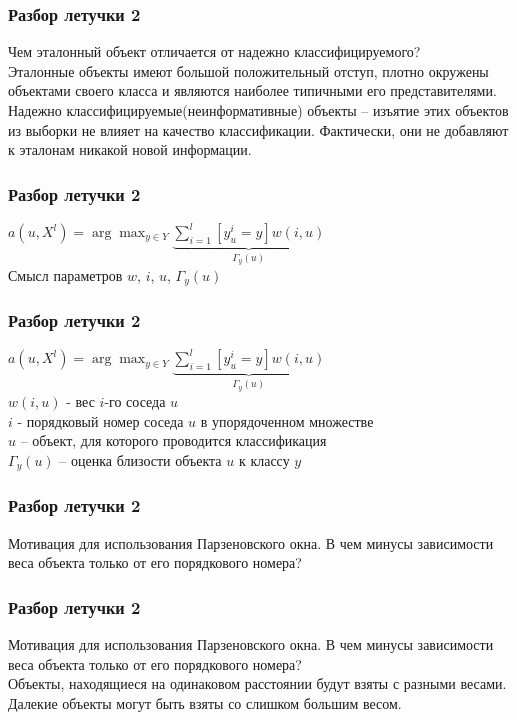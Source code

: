 \documentclass[12pt]{beamer}
\begin{document}
\begin{frame}\frametitle{Разбор летучки 2}
Чем эталонный объект отличается от надежно классифицируемого?\\
\vspace{8mm}
Эталонные объекты имеют большой положительный отступ, плотно окружены
объектами своего класса и являются наиболее типичными его представителями.\\
\vspace{5mm}
Надежно классифицируемые(неинформативные) объекты -- изъятие
этих объектов из выборки не влияет на качество классификации. Фактически, они не добавляют к эталонам никакой новой информации. 

\end{frame}


\begin{frame}\frametitle{Разбор летучки 2}
${a(u, X^l) = \arg\max_{y \in Y} \underbrace{\sum\limits_{i=1}^l [y_u^i = y]w(i, u)}_{\Gamma_y(u)} }$\\
Смысл параметров $w$, $i$, $u$, $\Gamma_y(u)$
\end{frame}

\begin{frame}\frametitle{Разбор летучки 2}
${a(u, X^l) = \arg\max_{y \in Y} \underbrace{\sum\limits_{i=1}^l [y_u^i = y]w(i, u)}_{\Gamma_y(u)} }$\\
$w(i, u)$ - вес $i$-го соседа $u$ \\
$i$ - порядковый номер соседа $u$ в упорядоченном множестве\\
$u$ -- объект, для которого проводится классификация\\
$\Gamma_y(u)$ -- оценка близости объекта $u$ к классу ${y}$
\end{frame}

\begin{frame}\frametitle{Разбор летучки 2}
Мотивация для использования Парзеновского окна. В чем минусы зависимости веса объекта только от его порядкового номера?
\end{frame}

\begin{frame}\frametitle{Разбор летучки 2}
Мотивация для использования Парзеновского окна. В чем минусы зависимости веса объекта только от его порядкового номера?\\
\vspace{5mm}
Объекты, находящиеся на одинаковом расстоянии будут взяты с разными весами. 
Далекие объекты могут быть взяты со слишком большим весом.
\end{frame}
\end{document}
